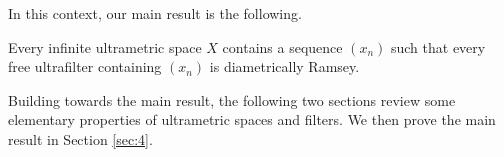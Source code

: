 In this context, our main result is the following.
\begin{theorem}
\label{main:result}
Every infinite ultrametric space \( X \) contains a sequence \( (x_{n}) \) such that every free ultrafilter containing \( (x_{n}) \) is diametrically Ramsey.
\end{theorem}

Building towards the main result, the following two sections review some elementary properties of ultrametric spaces and filters. We then prove the main result in Section \ref{sec:4}.
